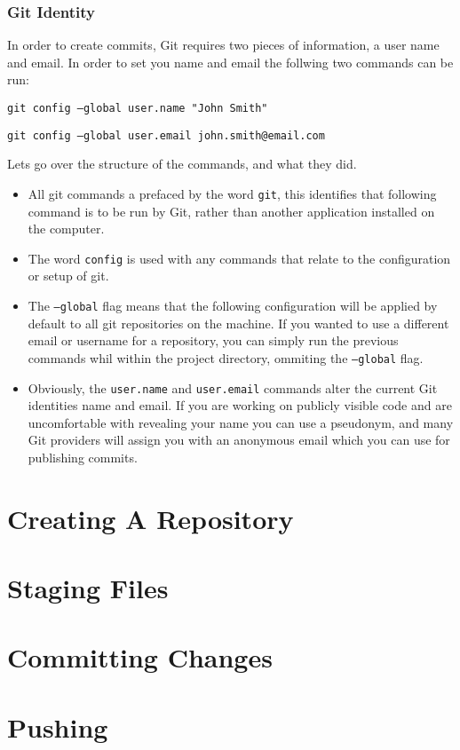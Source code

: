 \documentclass[11pt, a4paper, draft, titlepage]{article}
\begin{document}
\subsubsection*{Git Identity}
In order to create commits, Git requires two pieces of information, a user
name and email.
In order to set you name and email the follwing two commands can be run:

\texttt{git config --global user.name "John Smith"}

\texttt{git config --global user.email john.smith@email.com}

\noindent
Lets go over the structure of the commands, and what they did.

\begin {itemize}
\item
All git commands a prefaced by the word {\tt git}, this identifies that
following command is to be run by Git, rather than another application
installed on the computer.

\item
The word {\tt config} is used with any commands that relate to the
configuration or setup of git.

\item
The {\tt --global} flag means that the following configuration will be applied
by default to all git repositories on the machine.
If you wanted to use a different email or username for a repository, you can
simply run the previous commands whil within the project directory, ommiting
the {\tt --global} flag.

\item
Obviously, the {\tt user.name} and {\tt user.email} commands alter the current
Git identities name and email.
If you are working on publicly visible code and are uncomfortable with
revealing your name you can use a pseudonym, and many Git providers will
assign you with an anonymous email which you can use for publishing commits.
\end{itemize}



\section{Creating A Repository}



\section{Staging Files}



\section{Committing Changes}



\section{Pushing}
\end{document}
